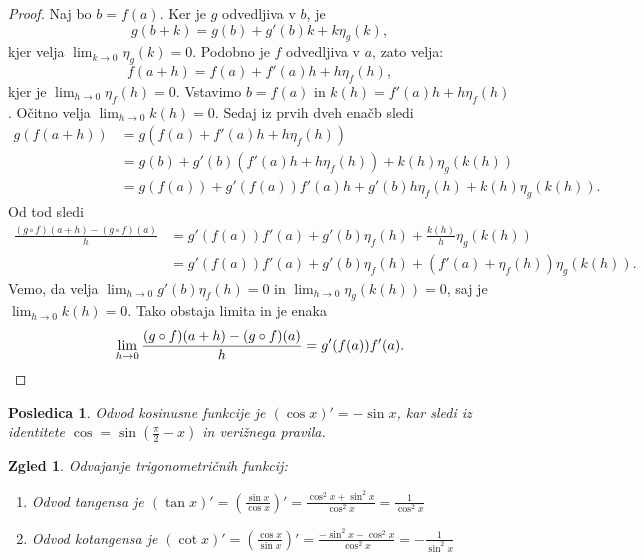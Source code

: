 \documentclass[10pt, a4paper]{article}
\newtheorem{posledica}[izr]{Posledica}
\newtheorem{zgled}[izr]{Zgled}
\newenvironment{noticeC}{%
  \tcolorbox[%
  notitle,
  empty,
  enhanced,  %
  breakable,
  coltext=black, 
  fontupper=\rmfamily,
  noparskip,
  sharp corners,
  boxrule=-1pt,  %
  frame hidden,
  left=7pt,  %
  right=7pt,
  top=5pt,
  bottom=5pt,
  before skip=2.5ex plus 2pt,
  after skip=2.5ex plus 2pt,
  overlay unbroken and last={%
  },
  ]}
{\endtcolorbox}
\newenvironment{dokaz}%
  {\begin{noticeC}\begin{proof}}%
  {\end{proof}\end{noticeC}}
\newcommand{\limf}[3]{\lim_{#1 \to #2} {#3}}
\begin{document}
\begin{dokaz}
    Naj bo $b = f(a)$. 
    Ker je $g$ odvedljiva v $b$, je $$g(b + k) = g(b) + g'(b) k + k \eta_g (k),$$ 
    kjer velja $\limf{k}{0}{\eta_g (k)} = 0.$
    Podobno je $f$ odvedljiva v $a$, zato velja:
    $$f(a + h) = f(a) + f'(a) h + h \eta_f (h),$$
    kjer je $\limf{h}{0}{\eta_f (h)} = 0.$
    Vstavimo $b = f(a)$ in $k(h) = f'(a) h + h \eta_f (h)$. 
    Očitno velja $\limf{h}{0}{k(h)} = 0$.
    Sedaj iz prvih dveh enačb sledi
    \begin{align*}
        g(f(a+h)) &= g(f(a) + f'(a) h + h \eta_f (h))\\
        &= g(b) + g'(b) (f'(a) h + h \eta_f (h)) + k(h) \eta_g (k(h))\\
        &= g(f(a)) + g'(f(a)) f'(a) h + g'(b) h \eta_f (h) + k(h) \eta_g (k(h)).
    \end{align*}
    Od tod sledi 
    \begin{align*}
        \frac{(g\circ f) (a+h) - (g \circ f) (a)}{h} &= g'(f(a)) f'(a) + g'(b) \eta_f (h) + \frac{k(h)}{h} \eta_g (k(h))\\
        &= g'(f(a)) f'(a) + g'(b) \eta_f (h) + (f'(a) + \eta_f (h)) \eta_g (k(h)).
    \end{align*}
    Vemo, da velja $\limf{h}{0}{g'(b) \eta_f (h)} = 0$ in $\limf{h}{0}{\eta_g (k(h))} = 0$, saj je $\limf{h}{0}{k(h)} = 0$.
    Tako obstaja limita in je enaka
    \begin{equation*}
        \limf{h}{0}{\frac{(g\circ f) (a+h) - (g \circ f) (a)}{h}} = g'(f(a)) f'(a). \qedhere
    \end{equation*}
\end{dokaz}

\begin{posledica}
    Odvod kosinusne funkcije je $(\cos x)' = - \sin x$, kar sledi iz identitete $\cos = \sin \left(\frac{\pi}{2} - x\right)$ in verižnega pravila.
\end{posledica}

\begin{zgled}
    Odvajanje trigonometričnih funkcij:
    \begin{enumerate}
        \item Odvod tangensa je $(\tan x)' = (\frac{\sin x}{\cos x})' = \frac{\cos^2 x + \sin^2 x}{\cos^2 x} = \frac{1}{\cos^2 x}$
        \item Odvod kotangensa je $(\cot x)' = (\frac{\cos x}{\sin x})' = \frac{-\sin^2 x - \cos^2 x}{\cos^2 x} = -\frac{1}{\sin^2 x}$
    \end{enumerate}
\end{zgled}
\end{document}

